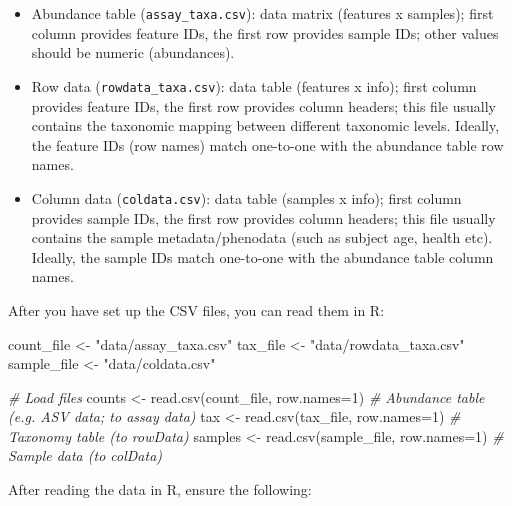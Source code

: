 \documentclass[
]{book}
\newenvironment{Shaded}{\begin{snugshade}}{\end{snugshade}}
\newcommand{\AttributeTok}[1]{\textcolor[rgb]{0.77,0.63,0.00}{#1}}
\newcommand{\CommentTok}[1]{\textcolor[rgb]{0.56,0.35,0.01}{\textit{#1}}}
\newcommand{\DecValTok}[1]{\textcolor[rgb]{0.00,0.00,0.81}{#1}}
\newcommand{\FunctionTok}[1]{\textcolor[rgb]{0.00,0.00,0.00}{#1}}
\newcommand{\NormalTok}[1]{#1}
\newcommand{\OtherTok}[1]{\textcolor[rgb]{0.56,0.35,0.01}{#1}}
\newcommand{\StringTok}[1]{\textcolor[rgb]{0.31,0.60,0.02}{#1}}
\begin{document}
\begin{itemize}
\item
  Abundance table (\texttt{assay\_taxa.csv}): data matrix (features x
  samples); first column provides feature IDs, the first row provides
  sample IDs; other values should be numeric (abundances).
\item
  Row data (\texttt{rowdata\_taxa.csv}): data table (features x info); first
  column provides feature IDs, the first row provides column headers;
  this file usually contains the taxonomic mapping between different
  taxonomic levels. Ideally, the feature IDs (row names) match one-to-one with
  the abundance table row names.
\item
  Column data (\texttt{coldata.csv}): data table (samples x info); first
  column provides sample IDs, the first row provides column headers;
  this file usually contains the sample metadata/phenodata (such as
  subject age, health etc). Ideally, the sample IDs match one-to-one with
  the abundance table column names.
\end{itemize}

After you have set up the CSV files, you can read them in R:

\begin{Shaded}
\begin{Highlighting}[]
\NormalTok{count\_file  }\OtherTok{\textless{}{-}} \StringTok{"data/assay\_taxa.csv"}
\NormalTok{tax\_file    }\OtherTok{\textless{}{-}} \StringTok{"data/rowdata\_taxa.csv"}
\NormalTok{sample\_file }\OtherTok{\textless{}{-}} \StringTok{"data/coldata.csv"}

\CommentTok{\# Load files}
\NormalTok{counts  }\OtherTok{\textless{}{-}} \FunctionTok{read.csv}\NormalTok{(count\_file, }\AttributeTok{row.names=}\DecValTok{1}\NormalTok{)   }\CommentTok{\# Abundance table (e.g. ASV data; to assay data)}
\NormalTok{tax     }\OtherTok{\textless{}{-}} \FunctionTok{read.csv}\NormalTok{(tax\_file, }\AttributeTok{row.names=}\DecValTok{1}\NormalTok{)     }\CommentTok{\# Taxonomy table (to rowData)}
\NormalTok{samples }\OtherTok{\textless{}{-}} \FunctionTok{read.csv}\NormalTok{(sample\_file, }\AttributeTok{row.names=}\DecValTok{1}\NormalTok{)  }\CommentTok{\# Sample data (to colData)}
\end{Highlighting}
\end{Shaded}

After reading the data in R, ensure the following:
\end{document}
